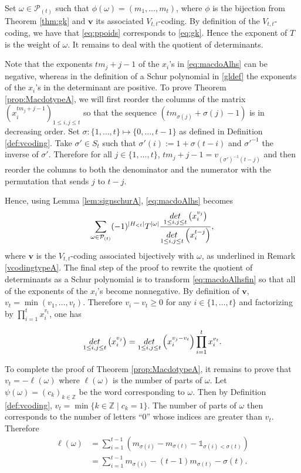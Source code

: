\documentclass[11pt,letterpaper]{amsart}
\def\bbbz{\mathbb Z}
\def\ccp{\mathcal P}
\def\det{{\rm det}}
\numberwithin{equation}{section}
\numberwithin{df}{section}
\begin{document}
Set $\omega\in\ccp_{(t)}$ such that $\phi(\omega)=(m_1,\dots,m_t)$, where $\phi$ is the bijection from Theorem \ref{thm:gk} and $\mathbf{v}$ its associated $V_{t,t}$-coding. By definition of the $V_{t,t}$-coding, we have that \eqref{eq:ppoids} corresponds to \eqref{eq:gk}. Hence the exponent of $T$ is the weight of $\omega$. It remains to deal with the quotient of determinants.

Note that the exponents $tm_j+j-1$ of the $x_i$'s in \eqref{eq:macdoAlhs} can be negative, whereas in the definition of a Schur polynomial in \eqref{gldef} the exponents of the $x_i$'s in the determinant are positive.
To prove Theorem \ref{prop:MacdotypeA}, we will first reorder the columns of the matrix $\left(x_i^{tm_j+j-1}\right)_{1\le i,j\le t}$ so that the sequence $(tm_{\sigma(j)}+\sigma(j)-1)$ is in decreasing order. Set $\sigma:\lbrace 1,\dots,t\rbrace\mapsto\lbrace 0,\dots,t-1\rbrace$ as defined in Definition \ref{def:vcoding}. Take $\sigma'\in S_t$ such that $\sigma'(i):=1+\sigma(t-i)$ and $\sigma'^{-1}$ the inverse of $\sigma'$. Therefore for all $j\in\lbrace 1,\dots,t\rbrace$, $tm_j+j-1=v_{(\sigma')^{-1}(t-j)}$ and then reorder the columns to both the denominator and the numerator with the permutation that sends $j$ to $t-j$.

Hence, using Lemma \ref{lem:signschurA}, \eqref{eq:macdoAlhs} becomes
\begin{equation}\label{eq:macdoAlhsfin}
\sum_{\omega\in\ccp_{(t)}}(-1)^{\lvert H_{< t} \rvert}T^{\lvert \omega\rvert}\frac{\underset{1\le i,j\le t}{\det}\left(x_i^{v_j}\right)}{\underset{1\le i,j\le t}{\det}\left(x_i^{t-j}\right)},
\end{equation}
where $\mathbf{v}$ is the $V_{t,t}$-coding associated bijectively with $\omega$, as underlined in Remark \ref{vcodingtypeA}.
The final step of the proof to rewrite the quotient of determinants as a Schur polynomial is to transform \eqref{eq:macdoAlhsfin} so that all of the exponents of the $x_i$'s become nonnegative. By definition of $\mathbf{v}$, $v_t=\min(v_1,\dots,v_t)$. Therefore $v_i-v_t\geq 0$ for any $i\in\lbrace 1,\dots,t \rbrace$ and factorizing by $\prod_{i=1}^t x_i^{v_t}$, one has

$$\underset{1\le i,j\le t}{\det}\left(x_i^{v_j}\right)=\underset{1\le i,j\le t}{\det}\left(x_i^{v_j-v_t}\right)\prod_{i=1}^t x_i^{v_t}.$$

To complete the proof of Theorem \ref{prop:MacdotypeA}, it remains to prove that $v_t=-\ell(\omega)$ where $\ell(\omega)$  is the number of parts of $\omega$. Let $\psi(\omega)=(c_k)_{k\in\bbbz}$ be the word corresponding to $\omega$. Then by Definition \ref{def:vcoding}, $v_t=\min\lbrace k\in\bbbz \mid c_k=1\rbrace$. The number of parts of $\omega$ then corresponds to the number of letters ``$0$'' whose indices are greater than $v_t$. Therefore
\begin{align*}
\ell(\omega)&=\sum_{i=1}^{t-1} (m_{\sigma(i)}-m_{\sigma(t)}-\mathds{1}_{\sigma(i)<\sigma(t)})\\
&=\sum_{i=1}^{t-1} m_{\sigma(i)}-(t-1)m_{\sigma(t)}-\sigma(t).
\end{align*}
\end{document}
